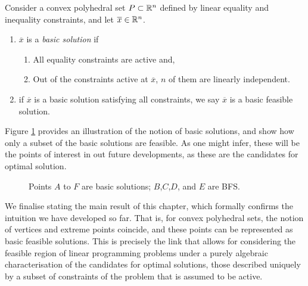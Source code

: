 \begin{definition} \label{p1c2:def:basic_feasible_solution}
	Consider a convex polyhedral set $P \subset \mathbb{R}^n$ defined by linear equality and inequality constraints, and let $\overline{x} \in \mathbb{R}^n$.
	\begin{enumerate}
		\item $\overline{x}$ is a \emph{basic solution} if 
		\begin{enumerate}
			\item All equality constraints are active and,
			\item Out of the constraints active at $\overline{x}$, $n$ of them are linearly independent.
		\end{enumerate}
		\item if $\overline{x}$  is a basic solution satisfying all constraints, we say $\overline{x}$ is a basic feasible solution. 
	\end{enumerate}
\end{definition}

Figure \ref{p1c2:fig:BFS} provides an illustration of the notion of basic solutions, and show how only a subset of the basic solutions are feasible. As one might infer, these will be the points of interest in out future developments, as these are the candidates for optimal solution.

\begin{figure}[h]
	\caption{Points $A$ to $F$ are basic solutions; $B$,$C$,$D$, and $E$ are BFS.} \label{p1c2:fig:BFS}
\end{figure}		

We finalise stating the main result of this chapter, which formally confirms the intuition we have developed so far. That is, for convex polyhedral sets, the notion of vertices and extreme points coincide, and these points can be represented as basic feasible solutions. This is precisely the link that allows for considering the feasible region of linear programming problems under a purely algebraic characterisation of the candidates for optimal solutions, those described uniquely by a subset of constraints of the problem that is assumed to be active.

